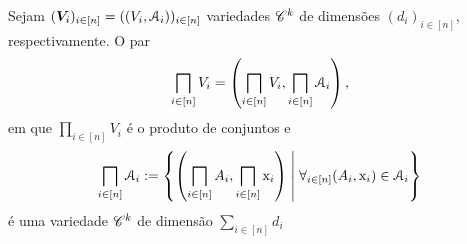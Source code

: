 \begin{exerc}
Sejam $(\bm V_i)_{i \in [n]} = ((V_i,\mathcal{A}_i))_{i \in [n]}$ variedades $\mathscr{C}^k$ de dimensões $(d_i)_{i \in [n]}$, respectivamente. O par
	\begin{equation*}
	\prod_{i \in [n]} V_i = \left( \prod_{i \in [n]} V_i, \prod_{i \in [n]} \atlas_i \right),
	\end{equation*}
em que $\prod_{i \in [n]} V_i$ é o produto de conjuntos e
	\begin{equation*}
	\prod_{i \in [n]} \atlas_i := \set{ \left(\prod_{i \in [n]} A_i, \prod_{i \in [n]} \x_i \right)}{\forall_{i \in [n]} (A_i,\x_i) \in \atlas_i}
	\end{equation*}
é uma variedade $\mathscr{C}^k$ de dimensão $\sum_{i \in [n]} d_i$
\end{exerc}

